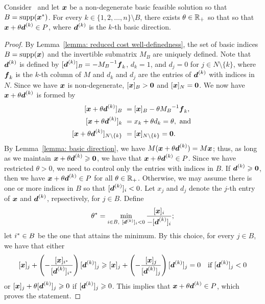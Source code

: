 \begin{lemma}\label{lemma: basic direction shift}
Consider \LPSA~and let ${\boldsymbol x}$ be a non-degenerate basic feasible solution so that $B = \operatorname{supp}({\boldsymbol x}^\ast)$. For every $k\in\{1, 2, \dots, n\} \setminus B$, there exists $\theta\in\mathbb R_{+}$ so that so that ${\boldsymbol x} + \theta {\boldsymbol d}^{(k)} \in P$, where ${\boldsymbol d}^{(k)}$ is the $k$-th basic direction. 
\end{lemma}
\begin{proof}
By Lemma~\ref{lemma: reduced cost well-definedness}, the set of basic indices $B = \operatorname{supp}({\boldsymbol x})$ and the invertible submatrix $M_B$ are uniquely defined. Note that ${\boldsymbol d}^{(k)}$ is defined by $[{\boldsymbol d}^{(k)}]_B = - {M_B}^{-1} {\boldsymbol f}_k$, $d_k = 1$, and $d_j = 0$ for $j\in N\setminus\{k\}$, where ${\boldsymbol f}_k$ is the $k$-th column of $M$ and $d_k$ and $d_j$ are the entries of ${\boldsymbol d}^{(k)}$ with indices in $N$. Since we have ${\boldsymbol x}$ is non-degenerate, $[{\boldsymbol x}]_B > \boldsymbol 0$ and $[{\boldsymbol x}]_N = \boldsymbol 0$. We now have 
${\boldsymbol x} + \theta {\boldsymbol d}^{(k)}$ is formed by
\begin{equation}\begin{split}\label{eqn:form-of-new-bfs}
[\bmx + \theta\bmd\rise k]_B ~& =  [\bmx]_B - \theta{M_B}^{-1}\bmf_k,  \\
[\bmx + \theta\bmd\rise k]_{k} ~& = x_k + \theta d_k = \theta, \text{ and } \\
[\bmx + \theta\bmd\rise k]_{N\setminus \{k\}} ~&= [\bmx]_{N\setminus \{k\}} = \bm0 . 
\end{split}\end{equation}
By Lemma~\ref{lemma: basic direction}, we have $M({\boldsymbol x} + \theta{\boldsymbol d}^{(k)}) = M{\boldsymbol x}$; thus, as long as we maintain ${\boldsymbol x} + \theta{\boldsymbol d}^{(k)}\geqslant \boldsymbol0$, we have that ${\boldsymbol x} + \theta{\boldsymbol d}^{(k)} \in P$. Since we have restricted $\theta > 0$, we need to control only the entries with indices in $B$. If ${\boldsymbol d}^{(k)} \geqslant \boldsymbol0$, then we have ${\boldsymbol x} + \theta {\boldsymbol d}^{(k)} \in P$ for all $\theta \in \mathbb R_{+}$. Otherwise, we may assume there is one or more indices in $B$ so that $[{\boldsymbol d}^{(k)}]_i < 0$. 
Let $x_j$ and $d_j$ denote the $j$-th entry of ${\boldsymbol x}$ and ${\boldsymbol d}^{(k)}$, repsectively, for $j \in B$. Define 
\[ \theta^\ast = \min_{i \in B,~[{\boldsymbol d}^{(k)}]_i < 0} \frac{[{\boldsymbol x}]_i}{ - [{\boldsymbol d}^{(k)}]_i}; \] 
let $i^\ast \in B$ be the one that attains the minimum. By this choice, for every $j\in B$, we have that either 
\[ [{\boldsymbol x}]_j + \left( -\frac{[{\boldsymbol x}]_{i^\ast}}{[{\boldsymbol d}^{(k)}]_{i^\ast}} \right) [{\boldsymbol d}^{(k)}]_j \geqslant [{\boldsymbol x}]_j + \left( -\frac{[{\boldsymbol x}]_j}{[{\boldsymbol d}^{(k)}]_j} \right) [{\boldsymbol d}^{(k)}]_j  = 0~~\text{ if $[{\boldsymbol d}^{(k)}]_j < 0$}\]
or $ [{\boldsymbol x}]_j + \theta [{\boldsymbol d}^{(k)}]_j \geqslant 0$ if $[{\boldsymbol d}^{(k)}]_j \geqslant 0$. 
This implies that ${\boldsymbol x} + \theta {\boldsymbol d}^{(k)} \in P$, which proves the statement. 
\end{proof}


